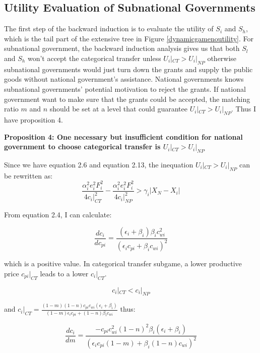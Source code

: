 \begin{itemize}
\subsection{Utility Evaluation of Subnational Governments}

The first step of the backward induction is to evaluate the utility of $S_i$ and $S_h$, which is the tail part of the extensive tree in Figure \ref{dynamicgamenoutility}. For subnational government, the backward induction analysis gives us that both $S_l$ and $S_h$ won't accept the categorical transfer unless $U_i|_{CT}>U_i|_{NP}$ otherwise subnational governments would just turn down the grants and supply the public goods without national government's assistance. National governments knows subnational governments' potential motivation to reject the grants. If national government want to make sure that the grants could be accepted, the matching ratio $m$ and $n$ should be set at a level that could guarantee $U_i|_{CT} > U_i|_{NP}$. Thus I have proposition 4.

\textbf{Proposition 4: One necessary but insufficient condition for national government to choose categorical transfer is $U_i|_{CT} > U_i|_{NP}$}

Since we have equation 2.6 and equation 2.13, the inequation $U_i|_{CT} > U_i|_{NP}$ can be rewritten as:
\begin{equation}
    \frac{\alpha_i^2 e_i^2 F_i^2}{4c_i|_{CT}^2}-\frac{\alpha_i^2 e_i^2 F_i^2}{4c_i|_{NP}^2} > \gamma_i|X_N-X_i|
\end{equation}\label{ctunpu}

From equation 2.4, I can calculate:

\begin{equation}
    \frac{dc_i}{dc_{pi}}=\frac{(\epsilon_i+\beta_i)\beta_i c_{wi}^2}{(\epsilon_ic_{pi}+\beta_i c_{wi})^2}
\end{equation}\label{dcipi}

which is a positive value. In categorical transfer subgame, a lower productive price $c_{pi}|_{CT}$ leads to a lower $c_i|_{CT}$.

\begin{equation}
    c_{i}|_{CT}<c_i|_{NP}
\end{equation}\label{ctpnpp}

and $c_i|_{CT}= \frac{(1-m)(1-n)c_{pi}c_{wi}(\epsilon_i+\beta_i)}{(1-m)\epsilon_i c_{pi} +(1-n)\beta_i c_{wi}}$ thus:

\begin{equation}
    \frac{dc_i}{dm}=\frac{-c_{pi}c_{wi}^2(1-n)^2\beta_i(\epsilon_i+\beta_i)}{(\epsilon_i c_{pi} (1-m)+\beta_i(1-n) c_{wi})^2}
\end{equation}\label{dcim}


\end{itemize}
